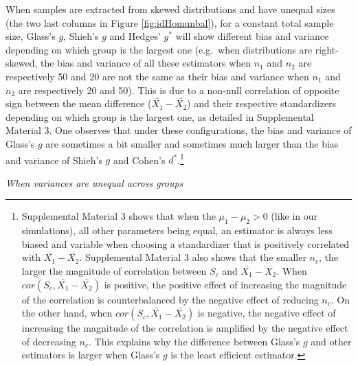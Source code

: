 \documentclass[
  english,
  man]{apa6}
\begin{document}
When samples are extracted from skewed distributions and have unequal sizes (the two last columns in Figure \ref{fig:idHomunbal}), for a constant total sample size, Glass's \(g\), Shieh's \(g\) and Hedges' \(g^*\) will show different bias and variance depending on which group is the largest one (e.g.~when distributions are right-skewed, the bias and variance of all these estimators when \(n_1\) and \(n_2\) are respectively 50 and 20 are not the same as their bias and variance when \(n_1\) and \(n_2\) are respectively 20 and 50). This is due to a non-null correlation of opposite sign between the mean difference (\(\bar{X_1}-\bar{X_2}\)) and their respective standardizers depending on which group is the largest one, as detailed in Supplemental Material 3. One observes that under these configurations, the bias and variance of Glass's \(g\) are sometimes a bit smaller and sometimes much larger than the bias and variance of Shieh's \(g\) and Cohen's \(d^*\).\footnote{Supplemental Material 3 shows that when the $\mu_1-\mu_2 >0$ (like in our simulations), all other parameters being equal, an estimator is always less biased and variable when choosing a standardizer that is positively correlated with $\bar{X_1}-\bar{X_2}$. Supplemental Material 3 also shows that the smaller $n_c$, the larger the magnitude of correlation between $S_c$ and $\bar{X_1}-\bar{X_2}$. When $cor(S_c,\bar{X_1}-\bar{X_2})$ is positive, the positive effect of increasing the magnitude of the correlation is counterbalanced by the negative effect of reducing $n_c$. On the other hand, when $cor(S_c,\bar{X_1}-\bar{X_2})$ is negative, the negative effect of increasing the magnitude of the correlation is amplified by the negative effect of decreasing $n_c$. This explains why the difference between Glass's $g$ and other estimators is larger when Glass's $g$ is the least efficient estimator.}

\emph{When variances are unequal across groups}
\end{document}
